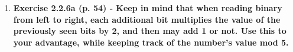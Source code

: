 \begin{enumerate}
\newpage
\item \textbf{Exercise 2.2.6a (p. 54) - Keep in mind that when reading binary
  from left to right, each additional bit multiplies the value of the
  previously seen bits by 2, and then may add 1 or not. Use this to your
  advantage, while keeping track of the number's value mod 5.}
\\\\


\end{enumerate}


